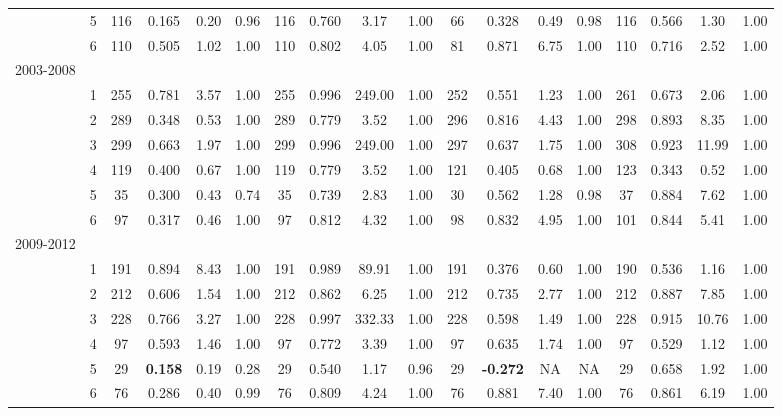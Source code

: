 \begin{sidewaystable}[p]
\begin{tabular}{p{1cm}p{.5cm}cccccccccccccccc}
 & \multicolumn{ 1}{c}{5} & 116 & 0.165  & 0.20  & 0.96  & 116 & 0.760  & 3.17  & 1.00  & 66 & 0.328  & 0.49  & 0.98  & 116 & 0.566  & 1.30  & 1.00  \\ 
 & \multicolumn{ 1}{c}{6} & 110 & 0.505 & 1.02  & 1.00  & 110 & 0.802 & 4.05  & 1.00  & 81 & 0.871  & 6.75  & 1.00  & 110 & 0.716  & 2.52  & 1.00  \\ 
2003-2008\\
 & \multicolumn{ 1}{c}{1} & 255 & 0.781  & 3.57  & 1.00  & 255 & 0.996  & 249.00  & 1.00  & 252 & 0.551  & 1.23  & 1.00  & 261 & 0.673  & 2.06  & 1.00  \\ 
 & \multicolumn{ 1}{c}{2} & 289 & 0.348  & 0.53  & 1.00  & 289 & 0.779  & 3.52  & 1.00  & 296 & 0.816  & 4.43  & 1.00  & 298 & 0.893  & 8.35  & 1.00  \\ 
 & \multicolumn{ 1}{c}{3} & 299 & 0.663  & 1.97  & 1.00  & 299 & 0.996  & 249.00  & 1.00  & 297 & 0.637  & 1.75  & 1.00  & 308 & 0.923  & 11.99  & 1.00  \\ 
 & \multicolumn{ 1}{c}{4} & 119 & 0.400  & 0.67  & 1.00  & 119 & 0.779  & 3.52  & 1.00  & 121 & 0.405  & 0.68  & 1.00  & 123 & 0.343  & 0.52  & 1.00  \\ 
 & \multicolumn{ 1}{c}{5} & 35 & 0.300  & 0.43  & 0.74  & 35 & 0.739  & 2.83  & 1.00  & 30 & 0.562  & 1.28  & 0.98  & 37 & 0.884  & 7.62  & 1.00  \\ 
 & \multicolumn{ 1}{c}{6} & 97 & 0.317 & 0.46  & 1.00  & 97 & 0.812 & 4.32  & 1.00  & 98 & 0.832  & 4.95  & 1.00  & 101 & 0.844  & 5.41  & 1.00  \\ 
2009-2012\\
 & \multicolumn{ 1}{c}{1} & 191 & 0.894  & 8.43  & 1.00  & 191 & 0.989  & 89.91  & 1.00  & 191 & 0.376  & 0.60  & 1.00  & 190 & 0.536  & 1.16  & 1.00  \\ 
\multicolumn{ 1}{c}{} & \multicolumn{ 1}{c}{2} & 212 & 0.606  & 1.54  & 1.00  & 212 & 0.862  & 6.25  & 1.00  & 212 & 0.735  & 2.77  & 1.00  & 212 & 0.887  & 7.85  & 1.00  \\ 
\multicolumn{ 1}{c}{} & \multicolumn{ 1}{c}{3} & 228 & 0.766  & 3.27  & 1.00  & 228 & 0.997  & 332.33  & 1.00  & 228 & 0.598  & 1.49  & 1.00  & 228 & 0.915  & 10.76  & 1.00  \\ 
\multicolumn{ 1}{c}{} & \multicolumn{ 1}{c}{4} & 97 & 0.593  & 1.46  & 1.00  & 97 & 0.772  & 3.39  & 1.00  & 97 & 0.635  & 1.74  & 1.00  & 97 & 0.529  & 1.12  & 1.00  \\ 
\multicolumn{ 1}{c}{} & \multicolumn{ 1}{c}{5} & 29 & \textbf{0.158 } & 0.19  & 0.28  & 29 & 0.540  & 1.17  & 0.96  & 29 & \textbf{-0.272 } & NA & NA & 29 & 0.658  & 1.92  & 1.00  \\ 
\multicolumn{ 1}{c}{} & \multicolumn{ 1}{c}{6} & 76 & 0.286 & 0.40  & 0.99  & 76 & 0.809 & 4.24  & 1.00  & 76 & 0.881  & 7.40  & 1.00  & 76 & 0.861  & 6.19  & 1.00  \\ \hline
\end{tabular}
\label{tab:SWposthoc}
\end{sidewaystable}
